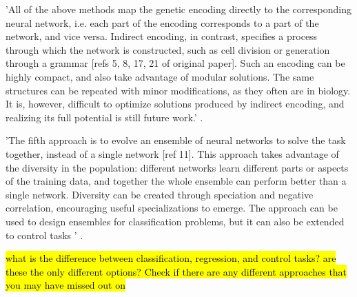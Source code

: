 

'All of the above methods map the genetic encoding directly to the corresponding neural network, i.e. each part of the encoding corresponds to a part of the network, and vice versa. Indirect encoding, in contrast, specifies a process through which the network is constructed, such as cell division or generation through a grammar [refs 5, 8, 17, 21 of original paper]. Such an encoding can be highly compact, and also take advantage of modular solutions. The same structures can be repeated with minor modifications, as they often are in biology. It is, however, difficult to optimize solutions produced by indirect encoding, and realizing its full potential is still future work.' \cite{Miikkulainen2010}.

'The fifth approach is to evolve an ensemble of neural networks to solve the task together, instead of a single network [ref 11]. This approach takes advantage of the diversity in the population: different networks learn different parts or aspects of the training data, and together the whole ensemble can perform better than a single network. Diversity can be created through speciation and negative correlation, encouraging useful specializations to emerge. The approach can be used to design ensembles for classification problems, but it can also be extended to control tasks ' \cite{Miikkulainen2010}.

\hl{what is the difference between classification, regression, and control tasks? are these the only different options? Check if there are any different approaches that you may have missed out on}

